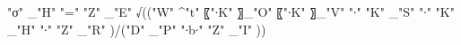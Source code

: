 "σ" _"H"  "=" "Z" _"E"  √(("W" ^"t"  〖"∙K" 〗_"O"  〖"∙K" 〗_"V"  "∙" "K" _"S"  "∙" "K" _"H"  "∙" "Z" _"R" )/("D" _"P"  "∙b∙" "Z" _"I"  ))